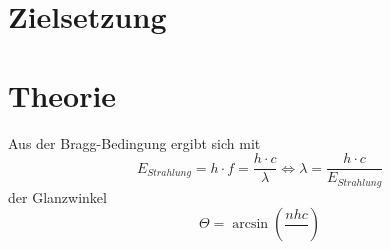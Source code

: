 \section{Zielsetzung}
\label{sec:Zielsetzung}

\section{Theorie}
\label{sec:Theorie}


























Aus der Bragg-Bedingung ergibt sich mit 
\begin{equation}
    E_{Strahlung} = h \cdot f = \frac{h \cdot c}{\lambda} \Leftrightarrow \lambda = \frac{h \cdot c}{E_{Strahlung}}
\end{equation}
der Glanzwinkel 
\begin{equation}
    \Theta = \arcsin(\frac{n h c}{})
\end{equation}
